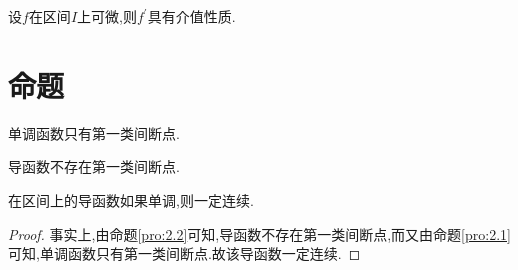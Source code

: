 \documentclass[lang=cn,newtx,10pt,scheme=chinese]{../Template/elegantbook}
\begin{document}
\begin{theorem}[$Darboux$定理]\label{Darboux定理}
设\(f\)在区间\(I\)上可微,则\(f^{\prime}\)具有介值性质.
\end{theorem}


\section{命题}

\begin{proposition}\label{pro:2.1}
单调函数只有第一类间断点.
\end{proposition}

\begin{proposition}\label{pro:2.2}
导函数不存在第一类间断点.
\end{proposition}

\begin{proposition}\label{pro:2.3}
在区间上的导函数如果单调,则一定连续.
\end{proposition}

\begin{proof}
事实上,由命题\ref{pro:2.2}可知,导函数不存在第一类间断点,而又由命题\ref{pro:2.1}可知,单调函数只有第一类间断点.故该导函数一定连续.
\end{proof}
\end{document}
